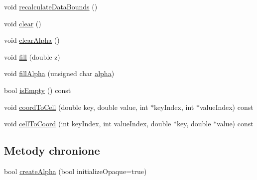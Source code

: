 \begin{DoxyCompactItemize}
\item 
void \hyperlink{class_q_c_p_color_map_data_ab235ade8a4d64bd3adb26a99b3dd57ee}{recalculate\+Data\+Bounds} ()
\item 
void \hyperlink{class_q_c_p_color_map_data_a9910ba830e96955bd5c8e5bef1e77ef3}{clear} ()
\item 
void \hyperlink{class_q_c_p_color_map_data_a14d08b9c3720cd719400079b86d3906b}{clear\+Alpha} ()
\item 
void \hyperlink{class_q_c_p_color_map_data_a350f783260eb9b5de5c7b5e0d5d3e3c2}{fill} (double z)
\item 
void \hyperlink{class_q_c_p_color_map_data_a93e2a549d7702bc849cd48a585294657}{fill\+Alpha} (unsigned char \hyperlink{class_q_c_p_color_map_data_a4f7e6b7a97017400cbbd46f0660e68ea}{alpha})
\item 
bool \hyperlink{class_q_c_p_color_map_data_a986009324aee1fc5f696db46bd03dde5}{is\+Empty} () const 
\item 
void \hyperlink{class_q_c_p_color_map_data_a26e33c5ec7094b60136350bcd77d3737}{coord\+To\+Cell} (double key, double value, int $\ast$key\+Index, int $\ast$value\+Index) const 
\item 
void \hyperlink{class_q_c_p_color_map_data_ac96d6e84befe7b9951b5da6d4d4a2a47}{cell\+To\+Coord} (int key\+Index, int value\+Index, double $\ast$key, double $\ast$value) const 
\end{DoxyCompactItemize}
\subsection*{Metody chronione}
\begin{DoxyCompactItemize}
\item 
bool \hyperlink{class_q_c_p_color_map_data_a42c2b1c303683515fa4de4c551f54441}{create\+Alpha} (bool initialize\+Opaque=true)
\end{DoxyCompactItemize}
